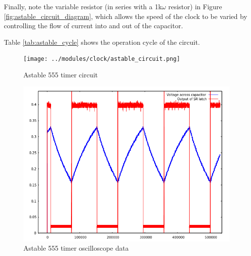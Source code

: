 \documentclass[12pt]{article}
\begin{document}
\begin{FlushLeft}
\vspace{0.3cm}

Finally, note the variable resistor (in series with a 1k$\omega$ resistor) in Figure \ref{fig:astable_circuit_diagram}, which allows the speed of the clock to be varied by controlling the flow of current into and out of the capacitor. \\

\vspace{0.3cm}

Table \ref{tab:astable_cycle} shows the operation cycle of the circuit. \\


\begin{figure}[h]
  \begin{center}
    \texttt{[image: ../modules/clock/astable\_circuit.png]}
    \caption{Astable 555 timer circuit}
    \label{fig:astable_circuit}
  \end{center}
\end{figure}

\begin{figure}[h]
  \begin{center}
    \includegraphics[width=\linewidth]{../modules/clock/astable_scope_no_caps.png}
    \caption{Astable 555 timer oscilloscope data}
    \label{fig:astable_scope}
  \end{center}
\end{figure}


\end{FlushLeft}
\end{document}
